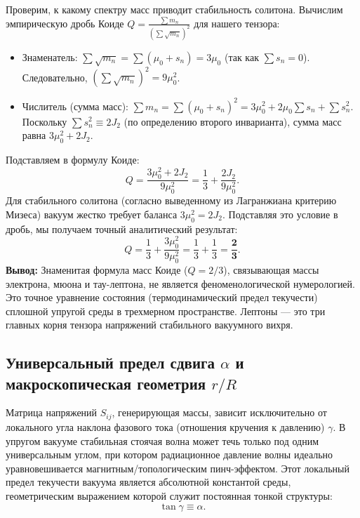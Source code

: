 \documentclass[11pt,a4paper]{article}
\begin{document}
Проверим, к какому спектру масс приводит стабильность солитона. Вычислим эмпирическую дробь Коиде $Q = \frac{\sum m_n}{(\sum \sqrt{m_n})^2}$ для нашего тензора:
\begin{itemize}
	\item Знаменатель: $\sum \sqrt{m_n} = \sum (\mu_0 + s_n) = 3\mu_0$ (так как $\sum s_n = 0$). Следовательно, $(\sum \sqrt{m_n})^2 = 9\mu_0^2$.
	\item Числитель (сумма масс): $\sum m_n = \sum (\mu_0 + s_n)^2 = 3\mu_0^2 + 2\mu_0\sum s_n + \sum s_n^2$. Поскольку $\sum s_n^2 \equiv 2J_2$ (по определению второго инварианта), сумма масс равна $3\mu_0^2 + 2J_2$.
\end{itemize}
Подставляем в формулу Коиде:
\begin{equation}
	Q = \frac{3\mu_0^2 + 2J_2}{9\mu_0^2} = \frac{1}{3} + \frac{2J_2}{9\mu_0^2}.
\end{equation}
Для стабильного солитона (согласно выведенному из Лагранжиана критерию Мизеса) вакуум жестко требует баланса $3\mu_0^2 = 2J_2$. Подставляя это условие в дробь, мы получаем точный аналитический результат:
\begin{equation}
	Q = \frac{1}{3} + \frac{3\mu_0^2}{9\mu_0^2} = \frac{1}{3} + \frac{1}{3} = \mathbf{\frac{2}{3}}.
\end{equation}
\textbf{Вывод:} Знаменитая формула масс Коиде ($Q=2/3$), связывающая массы электрона, мюона и тау-лептона, не является феноменологической нумерологией. Это точное уравнение состояния (термодинамический предел текучести) сплошной упругой среды в трехмерном пространстве. Лептоны — это три главных корня тензора напряжений стабильного вакуумного вихря.

\subsection{Универсальный предел сдвига $\alpha$ и макроскопическая геометрия $r/R$}
Матрица напряжений $S_{ij}$, генерирующая массы, зависит исключительно от локального угла наклона фазового тока (отношения кручения к давлению) $\gamma$.
В упругом вакууме стабильная стоячая волна может течь только под одним универсальным углом, при котором радиационное давление волны идеально уравновешивается магнитным/топологическим пинч-эффектом. Этот локальный предел текучести вакуума является абсолютной константой среды, геометрическим выражением которой служит постоянная тонкой структуры:
\begin{equation}
	\tan \gamma \equiv \alpha.
\end{equation}
\end{document}

